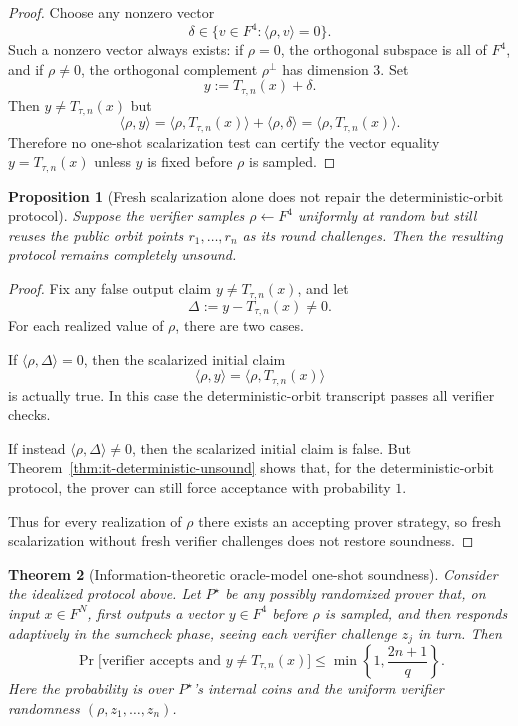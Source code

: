 \documentclass[11pt]{article}
\newtheorem{theorem}{Theorem}[section]
\newtheorem{proposition}[theorem]{Proposition}
\begin{document}
\begin{proof}
Choose any nonzero vector
\[
\delta\in\{v\in F^4 : \langle \rho,v\rangle=0\}.
\]
Such a nonzero vector always exists: if $\rho=0$, the orthogonal subspace is all of $F^4$, and if $\rho\neq 0$, the orthogonal complement $\rho^\perp$ has dimension $3$. Set
\[
y:=T_{\tau,n}(x)+\delta.
\]
Then $y\neq T_{\tau,n}(x)$ but
\[
\langle \rho,y\rangle
=
\langle \rho,T_{\tau,n}(x)\rangle+\langle \rho,\delta\rangle
=
\langle \rho,T_{\tau,n}(x)\rangle.
\]
Therefore no one-shot scalarization test can certify the vector equality $y=T_{\tau,n}(x)$ unless $y$ is fixed before $\rho$ is sampled.
\end{proof}

\begin{proposition}[Fresh scalarization alone does not repair the deterministic-orbit protocol]
\label{prop:it-rho-alone-not-enough}
Suppose the verifier samples $\rho\leftarrow F^4$ uniformly at random but still reuses the public orbit points $r_1,\dots,r_n$ as its round challenges. Then the resulting protocol remains completely unsound.
\end{proposition}

\begin{proof}
Fix any false output claim $y\neq T_{\tau,n}(x)$, and let
\[
\Delta:=y-T_{\tau,n}(x)\neq 0.
\]
For each realized value of $\rho$, there are two cases.

If $\langle \rho,\Delta\rangle=0$, then the scalarized initial claim
\[
\langle \rho,y\rangle=\langle \rho,T_{\tau,n}(x)\rangle
\]
is actually true. In this case the deterministic-orbit transcript passes all verifier checks.

If instead $\langle \rho,\Delta\rangle\neq 0$, then the scalarized initial claim is false. But Theorem~\ref{thm:it-deterministic-unsound} shows that, for the deterministic-orbit protocol, the prover can still force acceptance with probability $1$.

Thus for every realization of $\rho$ there exists an accepting prover strategy, so fresh scalarization without fresh verifier challenges does not restore soundness.
\end{proof}

\begin{theorem}[Information-theoretic oracle-model one-shot soundness]
\label{thm:it-oracle-soundness}
Consider the idealized protocol above. Let $P^\star$ be any possibly randomized prover that, on input $x\in F^N$, first outputs a vector $y\in F^4$ before $\rho$ is sampled, and then responds adaptively in the sumcheck phase, seeing each verifier challenge $z_j$ in turn. Then
\[
\Pr\big[\text{verifier accepts and }y\neq T_{\tau,n}(x)\big]
\le
\min\!\left\{1,\frac{2n+1}{q}\right\}.
\]
Here the probability is over $P^\star$'s internal coins and the uniform verifier randomness $(\rho,z_1,\dots,z_n)$.
\end{theorem}
\end{document}

